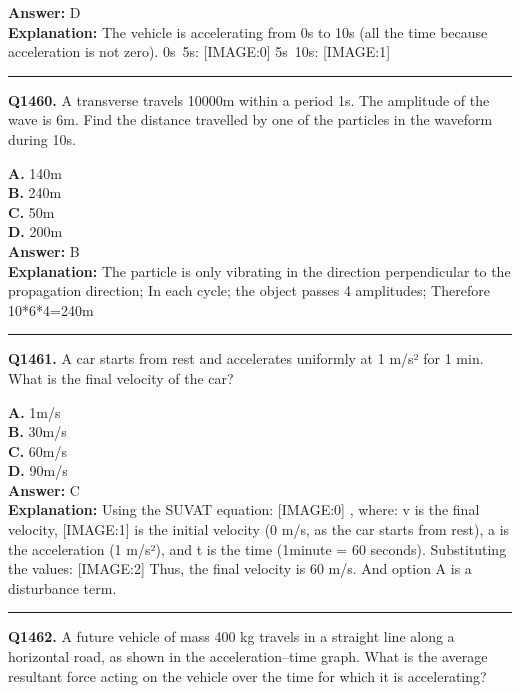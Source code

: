 \documentclass[12pt]{article}
\begin{document}
\textbf{Answer:} D \\
\textbf{Explanation:} The vehicle is accelerating from 0s to 10s (all the time because acceleration is not zero).
0s~5s:
[IMAGE:0]
5s~10s:
[IMAGE:1]

\hrule
\vspace{1em}


\noindent
\textbf{Q1460.} A transverse travels 10000m within a period 1s. The amplitude of the wave is 6m. Find the distance travelled by one of the particles in the waveform during 10s.



\textbf{A.} 140m \\
\textbf{B.} 240m \\
\textbf{C.} 50m \\
\textbf{D.} 200m \\

\textbf{Answer:} B \\
\textbf{Explanation:} The particle is only vibrating in the direction perpendicular to the propagation direction; In each cycle; the object passes 4 amplitudes; Therefore 10*6*4=240m

\hrule
\vspace{1em}


\noindent
\textbf{Q1461.} A car starts from rest and accelerates uniformly at 1 m/s² for 1 min. What is the final velocity of the car?



\textbf{A.} 1m/s \\
\textbf{B.} 30m/s \\
\textbf{C.} 60m/s \\
\textbf{D.} 90m/s \\

\textbf{Answer:} C \\
\textbf{Explanation:} Using the SUVAT equation:
[IMAGE:0]
, where: v is the final velocity,
[IMAGE:1]
is the initial velocity (0 m/s, as the car starts from rest), a is the acceleration (1 m/s²), and t is the time (1minute = 60 seconds). Substituting the values:
[IMAGE:2]
Thus, the final velocity is 60 m/s. And option A is a disturbance term.

\hrule
\vspace{1em}


\noindent
\textbf{Q1462.} A future vehicle of mass 400 kg travels in a straight line along a horizontal road, as shown in the acceleration–time graph.
What is the average resultant force acting on the vehicle over the time for which it is accelerating?
\end{document}
